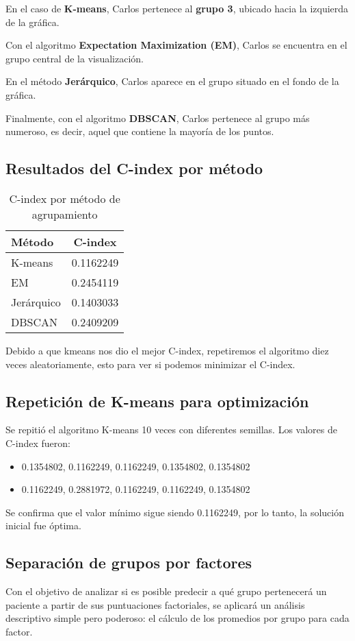 \documentclass[12pt]{report}
\begin{document}
En el caso de \textbf{K-means}, Carlos pertenece al \textbf{grupo 3}, ubicado hacia la izquierda de la gráfica. 

Con el algoritmo \textbf{Expectation Maximization (EM)}, Carlos se encuentra en el grupo central de la visualización. 

En el método \textbf{Jerárquico}, Carlos aparece en el grupo situado en el fondo de la gráfica. 

Finalmente, con el algoritmo \textbf{DBSCAN}, Carlos pertenece al grupo más numeroso, es decir, aquel que contiene la mayoría de los puntos.


\subsection{Resultados del C-index por método}
\begin{table}[H]
\centering
\begin{tabular}{|l|c|}
\hline
\textbf{Método} & \textbf{C-index} \\
\hline
K-means & 0.1162249 \\
EM & 0.2454119 \\
Jerárquico & 0.1403033 \\
DBSCAN & 0.2409209 \\
\hline
\end{tabular}
\caption{C-index por método de agrupamiento}
\end{table}
Debido a que kmeans nos dio el mejor C-index, repetiremos el algoritmo diez veces aleatoriamente, esto para ver si podemos minimizar el C-index.
\subsection{Repetición de K-means para optimización}
Se repitió el algoritmo K-means 10 veces con diferentes semillas. Los valores de C-index fueron:
\begin{itemize}
    \item 0.1354802, 0.1162249, 0.1162249, 0.1354802, 0.1354802
    \item 0.1162249, 0.2881972, 0.1162249, 0.1162249, 0.1354802
\end{itemize}
Se confirma que el valor mínimo sigue siendo 0.1162249, por lo tanto, la solución inicial fue óptima.
\newpage
\subsection{Separación de grupos por factores}
Con el objetivo de analizar si es posible predecir a qué grupo pertenecerá un paciente a partir de sus puntuaciones factoriales, se aplicará un análisis descriptivo simple pero poderoso: el cálculo de los promedios por grupo para cada factor.
\end{document}
